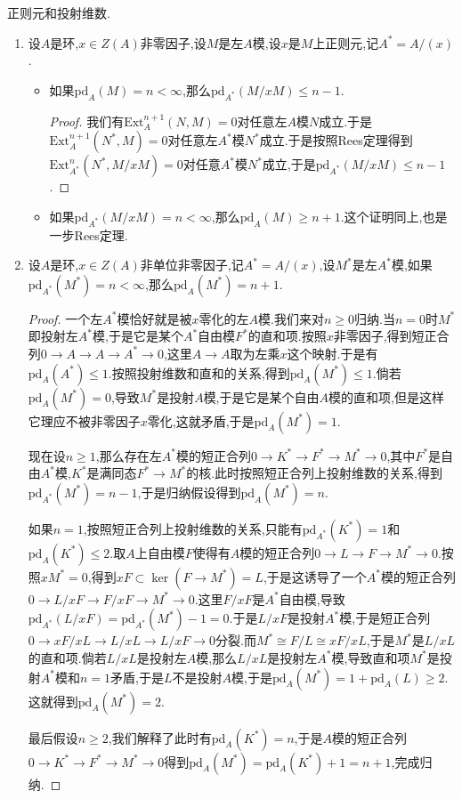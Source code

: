 正则元和投射维数.
\begin{enumerate}
	\item 设$A$是环,$x\in Z(A)$非零因子,设$M$是左$A$模,设$x$是$M$上正则元,记$A^*=A/(x)$.
	\begin{itemize}
		\item 如果$\mathrm{pd}_A(M)=n<\infty$,那么$\mathrm{pd}_{A^*}(M/xM)\le n-1$.
		\begin{proof}
			
			我们有$\mathrm{Ext}_A^{n+1}(N,M)=0$对任意左$A$模$N$成立.于是$\mathrm{Ext}_A^{n+1}(N^*,M)=0$对任意左$A^*$模$N^*$成立.于是按照Rees定理得到$\mathrm{Ext}_{A^*}^n(N^*,M/xM)=0$对任意$A^*$模$N^*$成立,于是$\mathrm{pd}_{A^*}(M/xM)\le n-1$.
		\end{proof}
	    \item 如果$\mathrm{pd}_{A^*}(M/xM)=n<\infty$,那么$\mathrm{pd}_A(M)\ge n+1$.这个证明同上,也是一步Rees定理.
	\end{itemize}
    \item 设$A$是环,$x\in Z(A)$非单位非零因子,记$A^*=A/(x)$,设$M^*$是左$A^*$模,如果$\mathrm{pd}_{A^*}(M^*)=n<\infty$,那么$\mathrm{pd}_A(M^*)=n+1$.
    \begin{proof}
    	
    	一个左$A^*$模恰好就是被$x$零化的左$A$模.我们来对$n\ge0$归纳.当$n=0$时$M^*$即投射左$A^*$模,于是它是某个$A^*$自由模$F^*$的直和项.按照$x$非零因子,得到短正合列$0\to A\to A\to A^*\to0$,这里$A\to A$取为左乘$x$这个映射.于是有$\mathrm{pd}_A(A^*)\le1$.按照投射维数和直和的关系,得到$\mathrm{pd}_A(M^*)\le1$.倘若$\mathrm{pd}_A(M^*)=0$,导致$M^*$是投射$A$模,于是它是某个自由$A$模的直和项,但是这样它理应不被非零因子$x$零化,这就矛盾,于是$\mathrm{pd}_A(M^*)=1$.
    	
    	现在设$n\ge1$,那么存在左$A^*$模的短正合列$0\to K^*\to F^*\to M^*\to0$,其中$F^*$是自由$A^*$模,$K^*$是满同态$F^*\to M^*$的核.此时按照短正合列上投射维数的关系,得到$\mathrm{pd}_{A^*}(M^*)=n-1$,于是归纳假设得到$\mathrm{pd}_A(M^*)=n$.
    	
    	如果$n=1$,按照短正合列上投射维数的关系,只能有$\mathrm{pd}_{A^*}(K^*)=1$和$\mathrm{pd}_A(K^*)\le2$.取$A$上自由模$F$使得有$A$模的短正合列$0\to L\to F\to M^*\to0$.按照$xM^*=0$,得到$xF\subset\ker(F\to M^*)=L$,于是这诱导了一个$A^*$模的短正合列$0\to L/xF\to F/xF\to M^*\to0$.这里$F/xF$是$A^*$自由模,导致$\mathrm{pd}_{A^*}(L/xF)=\mathrm{pd}_{A^*}(M^*)-1=0$.于是$L/xF$是投射$A^*$模,于是短正合列$0\to xF/xL\to L/xL\to L/xF\to0$分裂.而$M^*\cong F/L\cong xF/xL$,于是$M^*$是$L/xL$的直和项.倘若$L/xL$是投射左$A$模,那么$L/xL$是投射左$A^*$模,导致直和项$M^*$是投射$A^*$模和$n=1$矛盾,于是$L$不是投射$A$模,于是$\mathrm{pd}_A(M^*)=1+\mathrm{pd}_A(L)\ge2$.这就得到$\mathrm{pd}_A(M^*)=2$.
    	
    	最后假设$n\ge2$,我们解释了此时有$\mathrm{pd}_A(K^*)=n$,于是$A$模的短正合列$0\to K^*\to F^*\to M^*\to0$得到$\mathrm{pd}_A(M^*)=\mathrm{pd}_A(K^*)+1=n+1$,完成归纳.
    \end{proof}
\end{enumerate}

